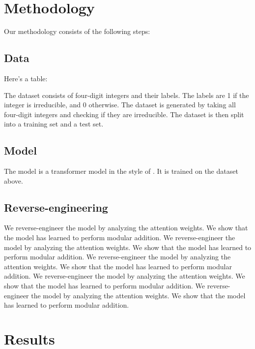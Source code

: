 \documentclass[11pt]{article} %
\begin{document}
\begin{multicols}{2}
  \section{Methodology}\label{methodology}

  Our methodology consists of the following steps:

  \subsection{Data}\label{data}

  Here's a table:


  The dataset consists of four-digit integers and their labels. The
  labels are 1 if the integer is irreducible, and 0 otherwise. The
  dataset is generated by taking all four-digit integers and checking if
  they are irreducible. The dataset is then split into a training set
  and a test set.

  \subsection{Model}\label{model}

  The model is a transformer model in the style of \textcite{hu2023}. It
  is trained on the dataset above.

  \subsection{Reverse-engineering}\label{reverse-engineering}

  We reverse-engineer the model by analyzing the attention weights. We
  show that the model has learned to perform modular addition. We
  reverse-engineer the model by analyzing the attention weights. We show
  that the model has learned to perform modular addition. We
  reverse-engineer the model by analyzing the attention weights. We show
  that the model has learned to perform modular addition. We
  reverse-engineer the model by analyzing the attention weights. We show
  that the model has learned to perform modular addition. We
  reverse-engineer the model by analyzing the attention weights. We show
  that the model has learned to perform modular addition.


  \section{Results}\label{results}


\end{multicols}
\end{document}
